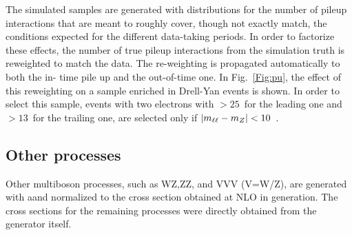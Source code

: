 The simulated samples are generated with distributions for the number of pileup interactions
that are meant to roughly cover, though not exactly match, the conditions expected for the
different data-taking periods. 
In order to factorize these effects, the number of true pileup interactions from the simulation truth is reweighted to match the data. 
The re-weighting is propagated automatically to both the in-
time pile up and the out-of-time one.
In Fig.~\ref{Fig:pu}, the effect of this reweighting on a sample enriched in Drell-Yan events is shown.
In order to select this sample, 
events with two electrons with \pt$> 25$~\GeV for the leading one and  \pt$>
13$~\GeV for the trailing one, are selected only if  $|m_{\ell\ell} - m_Z| < 10$~\GeV. 

\subsection*{Other processes} Other multiboson processes, such as WZ,ZZ, and VVV (V=W/Z), are generated with a\MCATNLO and normalized
to the cross section obtained at NLO in generation.
The cross sections for the remaining processes were directly obtained from the generator itself.

